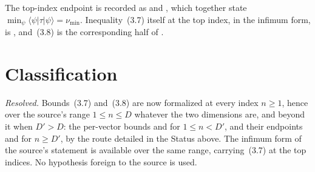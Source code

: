 \documentclass{article}
\begin{document}
The top-index endpoint is recorded as
 and
, which together
state $\min_\psi\langle\psi|\tau|\psi\rangle=\nu_{\min}$. Inequality~(3.7)
itself at the top index, in the infimum form, is
, and~(3.8) is
the corresponding half of
.

\section{Classification}

\emph{Resolved.} Bounds~(3.7) and~(3.8) are now formalized at every index
$n\ge1$, hence over the source's range $1\le n\le D$ whatever the two dimensions
are, and beyond it when $D'>D$: the per-vector bounds
 and
 for $1\le n<D'$, and
their endpoints
 and
 for $n\ge D'$, by
the route detailed in the Status above. The infimum form of the source's
statement is available over the same range,
 carrying~(3.7)
at the top indices. No hypothesis foreign to the source is used.



\end{document}
